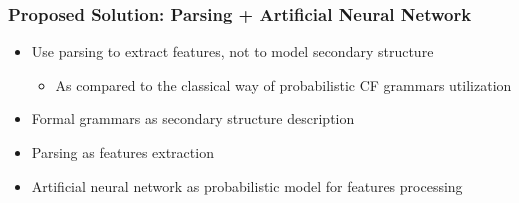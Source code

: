 \documentclass[xcolor=table]{beamer}
\begin{document}

%


\begin{frame} \frametitle{Proposed Solution: Parsing + Artificial Neural Network}

\begin{itemize}
  \item Use parsing to extract features, not to model secondary structure
  \begin{itemize}
    \item As compared to the classical way of probabilistic CF grammars utilization
  \end{itemize}
  \pause
  \item Formal grammars as secondary structure description
  \item Parsing as features extraction
  \item Artificial neural network as probabilistic model for features processing
\end{itemize}

\end{frame}
\end{document}
